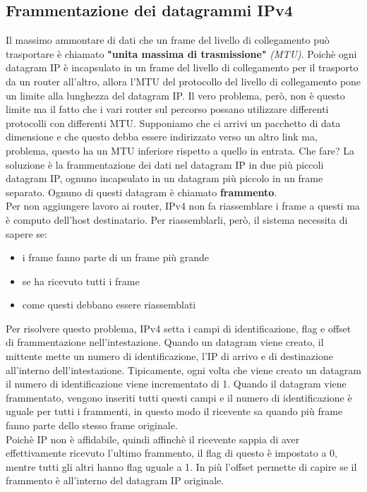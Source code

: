 \documentclass[11pt,a4paper]{book}
\begin{document}
\subsection{Frammentazione dei datagrammi IPv4} \label{par: MTU}
Il massimo ammontare di dati che un frame del livello di collegamento può trasportare è chiamato \textbf{"unita massima di trasmissione"} \textit{(MTU)}. Poichè ogni datagram IP è incapsulato in un frame del livello di collegamento per il trasporto da un router all'altro, allora l'MTU del protocollo del livello di collegamento pone un limite alla lunghezza del datagram IP. Il vero problema, però, non è questo limite ma il fatto che i vari router sul percorso possano utilizzare differenti protocolli con differenti MTU. Supponiamo che ci arrivi un pacchetto di data dimensione e che questo debba essere indirizzato verso un altro link ma, problema, questo ha un MTU inferiore rispetto a quello in entrata. Che fare? La soluzione è la frammentazione dei dati nel datagram IP in due più piccoli datagram IP, ognuno incapsulato in un datagram più piccolo in un frame separato. Ognuno di questi datagram è chiamato \textbf{frammento}. \\
Per non aggiungere lavoro ai router, IPv4 non fa riassemblare i frame a questi ma è computo dell'host destinatario. Per riassemblarli, però, il sistema necessita di sapere se:
\begin{itemize}
	\item i frame fanno parte di un frame più grande
	\item se ha ricevuto tutti i frame
	\item come questi debbano essere riassemblati
\end{itemize} 
Per risolvere questo problema, IPv4 setta i campi di identificazione, flag e offset di frammentazione nell'intestazione. Quando un datagram viene creato, il mittente mette un numero di identificazione, l'IP di arrivo e di destinazione all'interno dell'intestazione. Tipicamente, ogni volta che viene creato un datagram il numero di identificazione viene incrementato di 1. Quando il datagram viene frammentato, vengono inseriti tutti questi campi e il numero di identificazione è uguale per tutti i frammenti, in questo modo il ricevente sa quando più frame fanno parte dello stesso frame originale. \\
Poichè IP non è affidabile, quindi affinchè il ricevente sappia di aver effettivamente ricevuto l'ultimo frammento, il flag di questo è impostato a 0, mentre tutti gli altri hanno flag uguale a 1. In più l'offset permette di capire se il frammento è all'interno del datagram IP originale. \\
\end{document}
